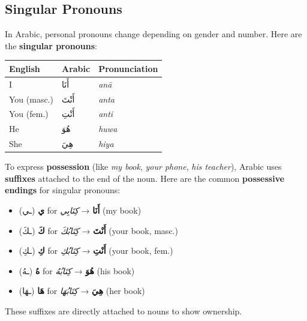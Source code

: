 \documentclass[
  a4paper,
  DIV=11,
  numbers=noendperiod]{scrartcl}
\providecommand{\tightlist}{%
  \setlength{\itemsep}{0pt}\setlength{\parskip}{0pt}}
\begin{document}
\subsection{Singular Pronouns}\label{singular-pronouns}

In Arabic, personal pronouns change depending on gender and number. Here
are the \textbf{singular pronouns}:

\begin{longtable}[]{@{}lll@{}}
\toprule\noalign{}
English & Arabic & Pronunciation \\
\midrule\noalign{}
\endhead
\bottomrule\noalign{}
\endlastfoot
I & أَنَا & \emph{anā} \\
You (masc.) & أَنْتَ & \emph{anta} \\
You (fem.) & أَنْتِ & \emph{anti} \\
He & هُوَ & \emph{huwa} \\
She & هِيَ & \emph{hiya} \\
\end{longtable}

\begin{tcolorbox}[enhanced jigsaw, bottomrule=.15mm, arc=.35mm, colbacktitle=quarto-callout-tip-color!10!white, opacityback=0, toptitle=1mm, title=\textcolor{quarto-callout-tip-color}{\faLightbulb}\hspace{0.5em}{Possessive Endings Tip!}, colframe=quarto-callout-tip-color-frame, opacitybacktitle=0.6, colback=white, coltitle=black, titlerule=0mm, left=2mm, toprule=.15mm, bottomtitle=1mm, rightrule=.15mm, leftrule=.75mm, breakable]

To express \textbf{possession} (like \emph{my book}, \emph{your phone},
\emph{his teacher}), Arabic uses \textbf{suffixes} attached to the end
of the noun. Here are the common \textbf{possessive endings} for
singular pronouns:

\begin{itemize}
\tightlist
\item
  \textbf{ي} (ـي) for \textbf{أَنَا} → \emph{كِتَابِي} (my book)\\
\item
  \textbf{كَ} (ـكَ) for \textbf{أَنْتَ} → \emph{كِتَابُكَ} (your book, masc.)\\
\item
  \textbf{كِ} (ـكِ) for \textbf{أَنْتِ} → \emph{كِتَابُكِ} (your book, fem.)\\
\item
  \textbf{هُ} (ـهُ) for \textbf{هُوَ} → \emph{كِتَابُهُ} (his book)\\
\item
  \textbf{هَا} (ـهَا) for \textbf{هِيَ} → \emph{كِتَابُهَا} (her book)
\end{itemize}

These suffixes are directly attached to nouns to show ownership.

\end{tcolorbox}
\end{document}
